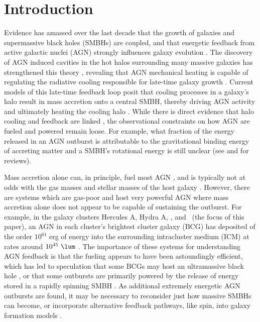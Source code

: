 \documentclass[11pt, preprint]{aastex}
\begin{document}

\keywords{\mykeywords}

\section{Introduction}
\label{sec:intro}

Evidence has amassed over the last decade that the growth of galaxies
and supermassive black holes (SMBHs) are coupled, and that energetic
feedback from active galactic nuclei (AGN) strongly influences galaxy
evolution \citep[\eg][]{1995ARA&A..33..581K, magorrian,
  1998A&A...331L...1S, 2000MNRAS.311..576K, 2000ApJ...539L...9F,
  2000ApJ...539L..13G, 2002ApJ...574..740T}. The discovery of AGN
induced cavities in the hot halos surrounding many massive galaxies
has strengthened this theory \citep[see][for a review]{mcnamrev},
revealing that AGN mechanical heating is capable of regulating the
radiative cooling responsible for late-time galaxy growth
\citep[\eg][]{birzan04, dunn06, rafferty06}. Current models of this
late-time feedback loop posit that cooling processes in a galaxy's
halo result in mass accretion onto a central SMBH, thereby driving AGN
activity and ultimately heating the cooling halo
\citep[\eg][]{croton06, bower06, sijacki07}. While there is direct
evidence that halo cooling and feedback are linked
\citep[\eg][]{haradent, rafferty08}, the observational constraints on
how AGN are fueled and powered remain loose. For example, what
fraction of the energy released in an AGN outburst is attributable to
the gravitational binding energy of accreting matter and a SMBH's
rotational energy is still unclear (see \citealt{1984RvMP...56..255B}
and \citealt{2002NewAR..46..247M} for reviews).

Mass accretion alone can, in principle, fuel most AGN
\citep[\eg][]{pizzolato05, 2006MNRAS.372...21A}, and is typically not
at odds with the gas masses and stellar masses of the host galaxy
\citep[\eg][]{rafferty06}. However, there are systems which are
gas-poor and host very powerful AGN where mass accretion alone does
not appear to be capable of sustaining the outburst. For example, in
the galaxy clusters Hercules A, Hydra A, \ms, and \rbs\ (the focus of
this paper), an AGN in each cluster's brightest cluster galaxy (BCG)
has deposited of the order $10^{61}$ erg of energy into the
surrounding intracluster medium (ICM) at rates around $10^{45} ~\lum$
\citep{herca, hydraa, ms0735}. The importance of these systems for
understanding AGN feedback is that the fueling appears to have been
astoundingly efficient, which has led to speculation that some BCGs
may host an ultramassive black hole \citep[$> 10^{10} ~\msol$;
  \eg][]{msspin}, or that some outbursts are primarily powered by the
release of energy stored in a rapidly spinning SMBH
\citep[\eg][]{minaspin}. As additional extremely energetic AGN
outbursts are found, it may be necessary to reconsider just how
massive SMBHs can become, or incorporate alternative feedback
pathways, like spin, into galaxy formation models
\citep[\eg][]{2003ApJ...585L.101H, 2007ApJ...658..815S,
  2009MNRAS.397.1302B}.
\end{document}
